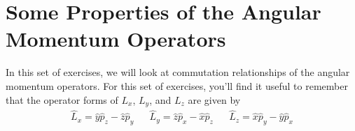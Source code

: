 %
%
%
%

\section*{Some Properties of the Angular Momentum Operators}

	In this set of exercises, we will look at commutation relationships of the angular momentum operators.  For this set of exercises, you'll find it useful to remember that the operator forms of $L_x$, $L_y$, and $L_z$ are given by
			\begin{align*}
				\hat L_x = \hat y \hat p_z - \hat z \hat p_y & &
				\hat L_y = \hat z \hat p_x - \hat x \hat p_z & &
				\hat L_z = \hat x \hat p_y - \hat y \hat p_x
			\end{align*}

